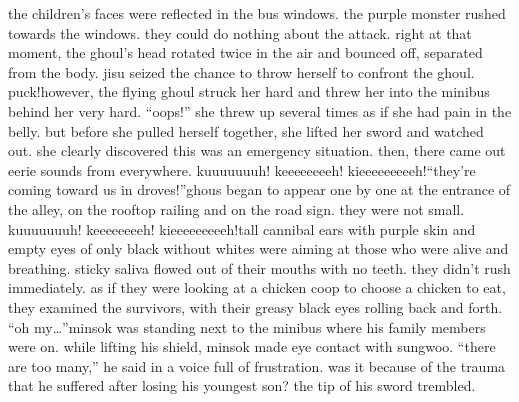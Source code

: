 the children’s faces were reflected in the bus windows.
 the purple monster rushed towards the windows.
 they could do nothing about the attack.
right at that moment, the ghoul’s head rotated twice in the air and bounced off, separated from the body.
jisu seized the chance to throw herself to confront the ghoul.
puck!however, the flying ghoul struck her hard and threw her into the minibus behind her very hard.
“oops!” she threw up several times as if she had pain in the belly.
but before she pulled herself together, she lifted her sword and watched out.
 she clearly discovered this was an emergency situation.
then, there came out eerie sounds from everywhere.
kuuuuuuuh! keeeeeeeeh! kieeeeeeeeeh!“they’re coming toward us in droves!”ghous began to appear one by one at the entrance of the alley, on the rooftop railing and on the road sign.
 they were not small.
kuuuuuuuh! keeeeeeeeh! kieeeeeeeeeh!tall cannibal ears with purple skin and empty eyes of only black without whites were aiming at those who were alive and breathing.
 sticky saliva flowed out of their mouths with no teeth.
they didn’t rush immediately.
 as if they were looking at a chicken coop to choose a chicken to eat, they examined the survivors, with their greasy black eyes rolling back and forth.
“oh my…”minsok was standing next to the minibus where his family members were on.
while lifting his shield, minsok made eye contact with sungwoo.
“there are too many,” he said in a voice full of frustration.
was it because of the trauma that he suffered after losing his youngest son? the tip of his sword trembled.


 